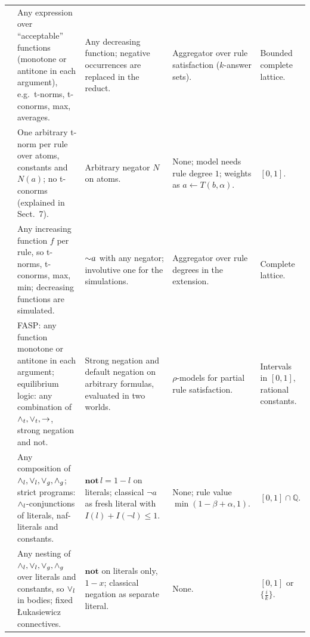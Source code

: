 {\begin{longtable}{@{}p{}p{}p{}p{}p{}@{}}
            \cite{JanssenSVD09}                              & Any expression over ``acceptable'' functions (monotone or antitone in each argument), e.g.\ t-norms, t-conorms, max, averages.                     & Any decreasing function; negative occurrences are replaced in the reduct.                          & Aggregator over rule satisfaction ($k$-answer sets).                                            & Bounded complete lattice.                             \\
            \cite{JanssenVSD12}                              & One arbitrary t-norm per rule over atoms, constants and $N(a)$; no t-conorms (explained in Sect.~7).                                               & Arbitrary negator $N$ on atoms.                                                                    & None; model needs rule degree $1$; weights as $a\leftarrow T(b,\alpha)$.                        & $[0,1]$.                                              \\
            \cite{JanssenSVD12core}                          & Any increasing function $f$ per rule, so t-norms, t-conorms, max, min; decreasing functions are simulated.                                         & $\mathord{\sim}  a$ with any negator; involutive one for the simulations.                                 & Aggregator over rule degrees in the extension.                                                  & Complete lattice.                                     \\
            \cite{SchockaertJVD09,SchockaertJV12}            & FASP: any function monotone or antitone in each argument; equilibrium logic: any combination of $\land_t,\lor_t,\to$, strong negation and not. & Strong negation and default negation on arbitrary formulas, evaluated in two worlds.               & $\rho$-models for partial rule satisfaction.                                                    & Intervals in $[0,1]$, rational constants.             \\
            \cite{BlondeelSVD14}                             & Any composition of $\land_l,\lor_l,\lor_g,\land_g$; strict programs: $\land_l$-conjunctions of literals, naf-literals and constants.     & $\mathbf{not}\,l=1-l$ on literals; classical $\neg a$ as fresh literal with $I(l)+I(\neg l)\leq1$. & None; rule value $\min(1-\beta+\alpha,1)$.                                                      & $[0,1]\cap\mathbb{Q}$.                                \\
            \cite{MushthofaSD14,MushthofaSD15,MushthofaSD20} & Any nesting of $\land_l,\lor_l,\lor_g,\land_g$ over literals and constants, so $\lor_l$ in bodies; fixed Łukasiewicz connectives.        & $\mathbf{not}$ on literals only, $1-x$; classical negation as separate literal.                    & None.                                                                                           & $[0,1]$ or $\{\frac{i}{k}\}$.                         \\

\end{longtable}}
